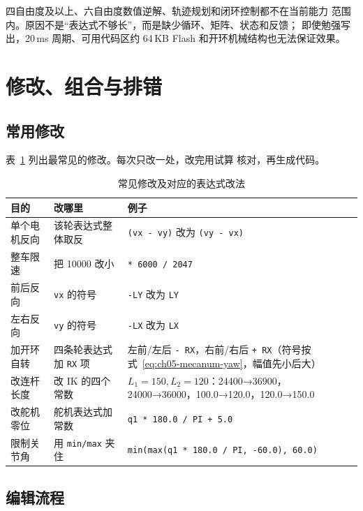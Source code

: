 四自由度及以上、六自由度数值逆解、轨迹规划和闭环控制都不在当前能力
范围内。原因不是“表达式不够长”，而是缺少循环、矩阵、状态和反馈；
即使勉强写出，20\,ms 周期、可用代码区约 64\,KB Flash 和开环机械结构也无法保证效果。

\section{修改、组合与排错}

\subsection{常用修改}

表~\ref{tab:ch05-edits} 列出最常见的修改。每次只改一处，改完用试算
核对，再生成代码。

\begin{table}[htbp]
  \centering
  \small
  \begin{tabularx}{\linewidth}{@{}l >{\raggedright\arraybackslash}X >{\raggedright\arraybackslash}X@{}}
    \toprule
    目的 & 改哪里 & 例子 \\
    \midrule
    单个电机反向 & 该轮表达式整体取反 & \texttt{(vx - vy)} 改为 \texttt{(vy - vx)} \\
    整车限速 & 把 10000 改小 & \texttt{* 6000 / 2047} \\
    前后反向 & \texttt{vx} 的符号 & \texttt{-LY} 改为 \texttt{LY} \\
    左右反向 & \texttt{vy} 的符号 & \texttt{-LX} 改为 \texttt{LX} \\
    加开环自转 & 四条轮表达式加 \texttt{RX} 项 & 左前/左后 \texttt{- RX}，右前/右后 \texttt{+ RX}（符号按式~\eqref{eq:ch05-mecanum-yaw}，幅值先小后大） \\
    改连杆长度 & 改 IK 的四个常数 & $L_1=150,L_2=120$：24400→36900，24000→36000，100.0→120.0，120.0→150.0 \\
    改舵机零位 & 舵机表达式加常数 & \texttt{q1 * 180.0 / PI + 5.0} \\
    限制关节角 & 用 \texttt{min/max} 夹住 & \texttt{min(max(q1 * 180.0 / PI, -60.0), 60.0)} \\
    \bottomrule
  \end{tabularx}
  \caption{常见修改及对应的表达式改法}
  \label{tab:ch05-edits}
\end{table}

\subsection{编辑流程}

